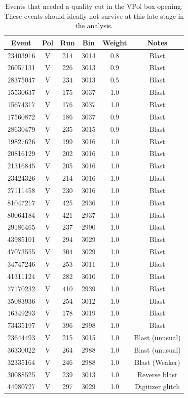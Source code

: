 \begin{table}
\centering
\begin{tabular}{ |c|c|c|c|c|c| } 
\hline
Event & Pol & Run & Bin & Weight & Notes \\
\hline
23403916 & V & 214 & 3014 & 0.8 & Blast\\
26057131 & V & 226 & 3013 & 0.9 & Blast\\
28375047 & V & 234 & 3013 & 0.5 & Blast\\
15530637 & V & 175 & 3037 & 1.0 & Blast\\
15674317 & V & 176 & 3037 & 1.0 & Blast\\
17560872 & V & 186 & 3037 & 0.9 & Blast\\
28630479 & V & 235 & 3015 & 0.9 & Blast\\
19827626 & V & 199 & 3016 & 1.0 & Blast\\
20816129 & V & 202 & 3016 & 1.0 & Blast\\
21316845 & V & 205 & 3016 & 1.0 & Blast\\
23424326 & V & 214 & 3016 & 1.0 & Blast\\
27111458 & V & 230 & 3016 & 1.0 & Blast\\
81047217 & V & 425 & 2936 & 1.0 & Blast\\
80064184 & V & 421 & 2937 & 1.0 & Blast\\
29186465 & V & 237 & 2990 & 1.0 & Blast\\
43985101 & V & 294 & 3029 & 1.0 & Blast\\
47073555 & V & 304 & 3029 & 1.0 & Blast\\
34747246 & V & 253 & 3011 & 1.0 & Blast\\
41311124 & V & 282 & 3010 & 1.0 & Blast\\
77170232 & V & 410 & 2939 & 1.0 & Blast\\
35083936 & V & 254 & 3012 & 1.0 & Blast\\
16349293 & V & 178 & 3019 & 1.0 & Blast\\
73435197 & V & 396 & 2998 & 1.0 & Blast\\
23644493 & V & 215 & 3015 & 1.0 & Blast (unusual)\\
36330022 & V & 264 & 2988 & 1.0 & Blast (unusual)\\
32335164 & V & 246 & 2988 & 1.0 & Blast (Weaker)\\
30088525 & V & 239 & 3013 & 1.0 & Reverse blast\\
44980727 & V & 297 & 3029 & 1.0 & Digitizer glitch\\
\hline
\end{tabular}
\caption{Events that needed a quality cut in the VPol box opening. These events should ideally not survive at this late stage in the analysis.}
\label{vpol_blast}
\end{table}


